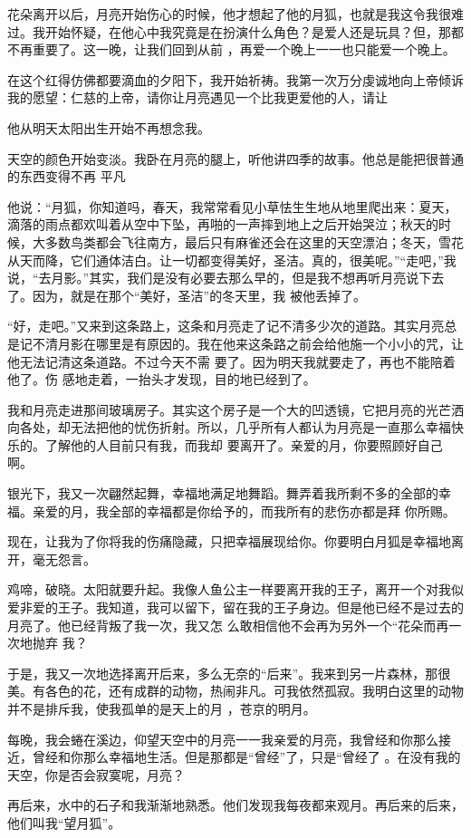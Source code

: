 \documentclass{article}
\begin{document}
花朵离开以后，月亮开始伤心的时候，他才想起了他的月狐，也就是我这令我很难过。我开始怀疑，在他心中我究竟是在扮演什么角色？是爱人还是玩具？但，那都不再重要了。这一晚，让我们回到从前
，再爱一个晚上一一也只能爱一个晚上。 

在这个红得仿佛都要滴血的夕阳下，我开始祈祷。我第一次万分虔诚地向上帝倾诉我的愿望：仁慈的上帝，请你让月亮遇见一个比我更爱他的人，请让
\newpage

他从明天太阳出生开始不再想念我。 

天空的颜色开始变淡。我卧在月亮的腿上，听他讲四季的故事。他总是能把很普通的东西变得不再
平凡 

他说：“月狐，你知道吗，春天，我常常看见小草怯生生地从地里爬出来：夏天，滴落的雨点都欢叫着从空中下坠，再啪的一声摔到地上之后开始哭泣；秋天的时候，大多数鸟类都会飞往南方，最后只有麻雀还会在这里的天空漂泊；冬天，雪花从天而降，它们通体洁白。让一切都变得美好，圣洁。真的，很美呢。”“走吧，”我说，“去月影。”其实，我们是没有必要去那么早的，但是我不想再听月亮说下去了。因为，就是在那个“美好，圣洁”的冬天里，我
被他丢掉了。 

“好，走吧。”又来到这条路上，这条和月亮走了记不清多少次的道路。其实月亮总是记不清月影在哪里是有原因的。我在他来这条路之前会给他施一个小小的咒，让他无法记清这条道路。不过今天不需
\newpage
要了。因为明天我就要走了，再也不能陪着他了。伤
感地走着，一抬头才发现，目的地已经到了。 

我和月亮走进那间玻璃房子。其实这个房子是一个大的凹透镜，它把月亮的光芒洒向各处，却无法把他的忧伤折射。所以，几乎所有人都认为月亮是一直那么幸福快乐的。了解他的人目前只有我，而我却
要离开了。亲爱的月，你要照顾好自己啊。 

银光下，我又一次翩然起舞，幸福地满足地舞蹈。舞弄着我所剩不多的全部的幸福。亲爱的月，我全部的幸福都是你给予的，而我所有的悲伤亦都是拜
你所赐。 

现在，让我为了你将我的伤痛隐藏，只把幸福展现给你。你要明白月狐是幸福地离开，毫无怨言。

鸡啼，破晓。太阳就要升起。我像人鱼公主一样要离开我的王子，离开一个对我似爱非爱的王子。我知道，我可以留下，留在我的王子身边。但是他已经不是过去的月亮了。他已经背叛了我一次，我又怎
\newpage
么敢相信他不会再为另外一个“花朵而再一次地抛弃
我？ 

于是，我又一次地选择离开后来，多么无奈的“后来”。我来到另一片森林，那很美。有各色的花，还有成群的动物，热闹非凡。可我依然孤寂。我明白这里的动物并不是排斥我，使我孤单的是天上的月
，苍京的明月。 

每晚，我会蜷在溪边，仰望天空中的月亮一一我亲爱的月亮，我曾经和你那么接近，曾经和你那么幸福地生活。但是那都是“曾经”了，只是“曾经了
。在没有我的天空，你是否会寂寞呢，月亮？ 

再后来，水中的石子和我渐渐地熟悉。他们发现我每夜都来观月。再后来的后来，他们叫我“望月狐”。
\end{document}
